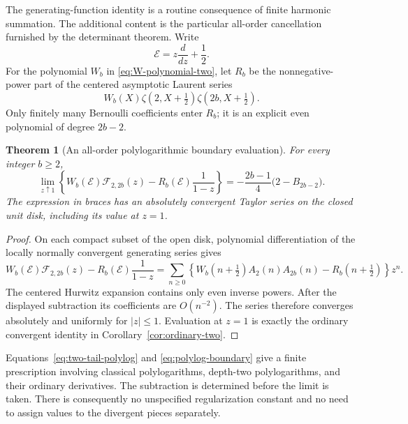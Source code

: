 \documentclass[11pt,a4paper]{article}
\numberwithin{equation}{section}
\theoremstyle{plain}
\newtheorem{theorem}{Theorem}[section]
\theoremstyle{definition}
\theoremstyle{remark}
\begin{document}
The generating-function identity is a routine consequence of finite
harmonic summation. The additional content is the particular
all-order cancellation furnished by the determinant theorem.
Write
\[
 \mathcal E=z\frac{d}{dz}+\frac12.
\]
For the polynomial $W_b$ in \eqref{eq:W-polynomial-two}, let
$R_b$ be the nonnegative-power part of the centered asymptotic
Laurent series
\begin{equation}\label{eq:polylog-subtraction}
 W_b(X)\zeta(2,X+\tfrac12)\zeta(2b,X+\tfrac12).
\end{equation}
Only finitely many Bernoulli coefficients enter $R_b$; it is an
explicit even polynomial of degree $2b-2$.

\begin{theorem}[An all-order polylogarithmic boundary evaluation]
\label{thm:polylog-boundary}
For every integer $b\ge2$,
\begin{equation}\label{eq:polylog-boundary}
 \boxed{\displaystyle
 \lim_{z\uparrow1}\left\{
 W_b(\mathcal E)\mathcal F_{2,2b}(z)
       -R_b(\mathcal E)\frac{1}{1-z}\right\}
 =-\frac{2b-1}{4}\bigl(2-B_{2b-2}\bigr).}
\end{equation}
The expression in braces has an absolutely convergent Taylor series
on the closed unit disk, including its value at $z=1$.
\end{theorem}
\begin{proof}
On each compact subset of the open disk, polynomial differentiation
of the locally normally convergent generating series gives
\[
 W_b(\mathcal E)\mathcal F_{2,2b}(z)
       -R_b(\mathcal E)\frac{1}{1-z}
 =\sum_{n\ge0}\left\{
 W_b(n+\tfrac12)A_2(n)A_{2b}(n)-R_b(n+\tfrac12)
 \right\}z^n.
\]
The centered Hurwitz expansion contains only even inverse powers.
After the displayed subtraction its coefficients are $O(n^{-2})$.
The series therefore converges absolutely and uniformly for $|z|\le1$.
Evaluation at $z=1$ is exactly the ordinary convergent identity in
Corollary~\ref{cor:ordinary-two}.
\end{proof}

Equations~\eqref{eq:two-tail-polylog} and
\eqref{eq:polylog-boundary} give a finite prescription involving
classical polylogarithms, depth-two polylogarithms, and their ordinary
derivatives. The subtraction is determined before the limit is taken.
There is consequently no unspecified regularization constant and
no need to assign values to the divergent pieces separately.



\end{document}
